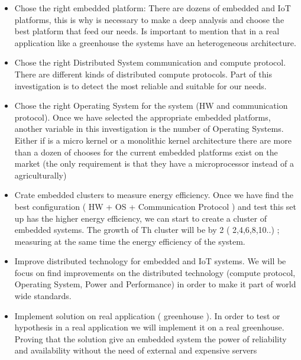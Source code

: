 \begin{itemize}
\item Chose the right embedded platform: There are dozens of embedded and IoT
    platforms, this is why is necessary to make a deep analysis and choose the
    best platform that feed our needs. Is important to mention that in a real
    application like a greenhouse the systems have an heterogeneous architecture.
\item Chose the right Distributed System communication and compute protocol.
    There are different kinds of distributed compute protocols. Part of this
    investigation is to detect the most reliable and suitable for our needs.
\item Chose the right Operating System for the system (HW and communication
    protocol). Once we have selected the appropriate embedded platforms, another 
    variable in this investigation is the number of Operating
    Systems. Either if is a micro kernel or a monolithic kernel architecture
    there are more than a dozen of chooses for the current embedded platforms
    exist on the market (the only requirement is that they have a microprocessor
    instead of a agriculturally)
\item Crate embedded clusters to measure energy efficiency. Once we have find
    the best configuration ( HW + OS + Communication Protocol ) and test this set
    up has the higher energy efficiency, we can start to create a cluster of
    embedded systems. The growth of Th cluster will be by 2 ( 2,4,6,8,10..) ;
    measuring at the same time the energy efficiency of the system.
\item Improve distributed technology for embedded and IoT systems. We will be
    focus on find improvements on the distributed technology (compute
    protocol, Operating System, Power and Performance) in order to make it part
    of world wide standards.
\item Implement solution on real application ( greenhouse ). In order to test
    or hypothesis in a real application we will implement it on a real
    greenhouse. Proving that the solution give an embedded system the power of
    reliability and availability without the need of external and expensive servers 
\end{itemize}


\clearpage
